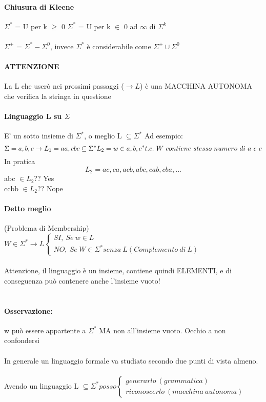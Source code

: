 \documentclass[12pt, a4paper, openany, oneside]{book}
\begin{document}
\paragraph{Chiusura di Kleene}
$\Sigma ^{*}$ = U per k $\geq$ 0 $\Sigma ^{*}$ = U per k $\in$ {0 ad $\infty$}
di $\Sigma ^{k}$
\\ \\
$\Sigma ^{+}$ = $\Sigma ^{*} - \Sigma ^{0}$, invece $\Sigma ^{*}$ è considerabile
come $\Sigma ^{+} \cup \Sigma ^{0}$
\paragraph{ATTENZIONE} La L che userò nei prossimi passaggi ($\to L$) è una MACCHINA 
AUTONOMA che verifica la stringa in questione
\paragraph{Linguaggio L su $\Sigma$}
E' un sotto insieme di $\Sigma ^{*}$, o meglio L  $\subseteq \Sigma ^{*}$ 
Ad esempio:
\[\Sigma = {a, b, c} \to L_{1}={aa, cbc}  \subseteq \Sigma ^{*} \\
L_{2} = {w \in {a,b,c}^{*} t.c. ~ W ~ contiene ~ stesso ~ numero~di~a~e~c} \]
In pratica
\[L_{2} = {ac, ca, acb, abc, cab, cba, ...}\]
abc $\in L_{2}$?? Yes\\
ccbb $\in L_{2}$?? Nope\\
\paragraph{Detto meglio} (Problema di Membership) \\ $W \in \Sigma ^{*} \to L 
\begin{cases}
SI, ~ Se ~ w \in L \\
NO, ~ Se ~ W \in \Sigma ^{*} senza ~ L (Complemento~di~L)
\end{cases}$ \\ \\
Attenzione, il linguaggio è un insieme, contiene quindi ELEMENTI, e di 
conseguenza può contenere anche l'insieme vuoto! \\ \\
\paragraph{Osservazione:} w può essere appartente a $\Sigma ^{*}$ MA non 
all'insieme vuoto. Occhio a non confondersi
\\ \\
In generale un linguaggio formale va studiato secondo due punti di vista almeno.
\\ \\
Avendo un linguaggio L  $\subseteq \Sigma ^{*} posso 
\begin{cases}
generarlo ~(grammatica)\\
riconoscerlo ~(macchina~autonoma)
\end{cases}$
\end{document}
